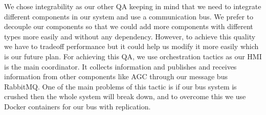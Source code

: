 We chose integrability as our other QA keeping in mind that we need to integrate different components in our system and use a communication bus. We prefer to decouple our components so that we could add more components with different types more easily and without any dependency. However, to achieve this quality we have to tradeoff performance but it could help us modify it more easily which is our future plan. For achieving this QA, we use orchestration tactics as our HMI is the main coordinator. It collects information and publishes and receives information from other components like AGC through our message bus RabbitMQ. One of the main problems of this tactic is if our bus system is crushed then the whole system will break down, and to overcome this we use Docker containers for our bus with replication. 
